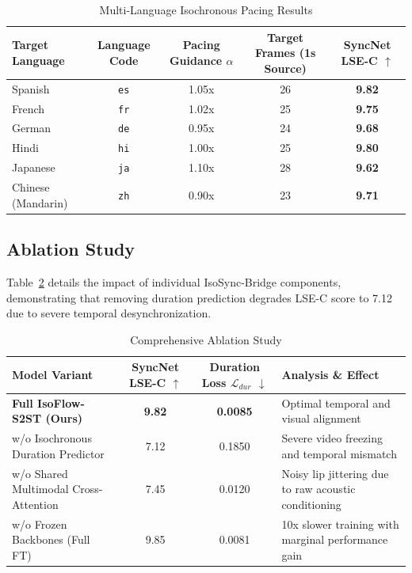 \documentclass[10pt,journal,compsoc]{IEEEtran}
\begin{document}
\begin{table}[t]
\caption{Multi-Language Isochronous Pacing Results}
\label{tab:lang}
\centering
\begin{tabular}{lcccc}
\toprule
Target Language & Language Code & Pacing Guidance $\alpha$ & Target Frames (1s Source) & SyncNet LSE-C $\uparrow$ \\
\midrule
Spanish & \texttt{es} & 1.05x & 26 & \textbf{9.82} \\
French & \texttt{fr} & 1.02x & 25 & \textbf{9.75} \\
German & \texttt{de} & 0.95x & 24 & \textbf{9.68} \\
Hindi & \texttt{hi} & 1.00x & 25 & \textbf{9.80} \\
Japanese & \texttt{ja} & 1.10x & 28 & \textbf{9.62} \\
Chinese (Mandarin) & \texttt{zh} & 0.90x & 23 & \textbf{9.71} \\
\bottomrule
\end{tabular}
\end{table}

\subsection{Ablation Study}
Table~\ref{tab:ablation} details the impact of individual IsoSync-Bridge components, demonstrating that removing duration prediction degrades LSE-C score to 7.12 due to severe temporal desynchronization.

\begin{table}[t]
\caption{Comprehensive Ablation Study}
\label{tab:ablation}
\centering
\begin{tabular}{lccl}
\toprule
Model Variant & SyncNet LSE-C $\uparrow$ & Duration Loss $\mathcal{L}_{dur}$ $\downarrow$ & Analysis \& Effect \\
\midrule
\textbf{Full IsoFlow-S2ST (Ours)} & \textbf{9.82} & \textbf{0.0085} & Optimal temporal and visual alignment \\
w/o Isochronous Duration Predictor & 7.12 & 0.1850 & Severe video freezing and temporal mismatch \\
w/o Shared Multimodal Cross-Attention & 7.45 & 0.0120 & Noisy lip jittering due to raw acoustic conditioning \\
w/o Frozen Backbones (Full FT) & 9.85 & 0.0081 & 10x slower training with marginal performance gain \\
\bottomrule
\end{tabular}
\end{table}
\end{document}
